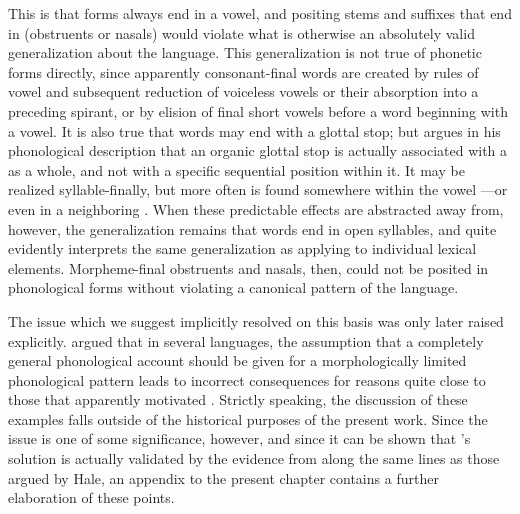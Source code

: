 This is that  forms always end in a vowel, and positing
stems and suffixes that end in  (obstruents or nasals) would
violate what is otherwise an absolutely valid generalization about the
language. This generalization is not true of phonetic forms directly,
since apparently consonant-final words are created by rules of vowel
 and subsequent reduction of voiceless vowels or their
absorption into a preceding spirant, or by elision of final short
vowels before a word beginning with a vowel. It is also true that
words may end with a glottal stop; but {\Sapir} argues in his
phonological description that an organic glottal stop is actually
associated with a  as a whole, and not with a specific
sequential position within it. It may be realized syllable-finally,
but more often is found somewhere within the vowel —or
even in a neighboring . When these predictable effects are
abstracted away from, however, the generalization remains that
 words end in open syllables, and {\Sapir} quite evidently
interprets the same generalization as applying to individual lexical
elements. Morpheme-final obstruents and nasals, then, could not be
posited in phonological forms without violating a canonical pattern of
the language.

The issue which we suggest {\Sapir} implicitly resolved on this basis was
only later raised explicitly. \citet{hale73:lardil} argued that in
several languages, the assumption that a completely general
phonological account should be given for a morphologically limited
phonological pattern leads to incorrect consequences for reasons quite
close to those that apparently motivated {\Sapir}. Strictly speaking, the
discussion of these examples falls outside of the historical purposes
of the present work. Since the issue is one of some significance,
however, and since it can be shown that {\Sapir}'s solution is actually
validated by the evidence from  along the same lines as
those argued by Hale, an appendix to the present chapter contains a
further elaboration of these points.

